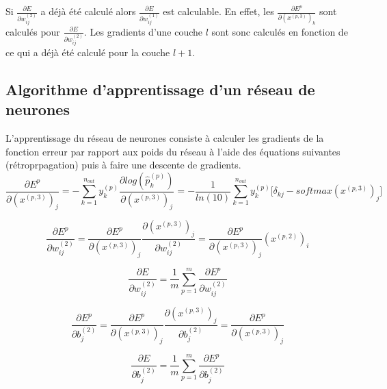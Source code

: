 \documentclass[a4paper,11pt,oneside,roman]{article}
\begin{document}
    Si $\frac{\partial E}{\partial w_{ij}^{(2)}}$ a déjà été calculé alors $\frac{\partial E}{\partial w_{ij}^{(1)}}$ est calculable. En effet, les $\frac{\partial E^p}{\partial (x^{(p,3)})_k}$ sont calculés pour $\frac{\partial E}{\partial w_{ij}^{(2)}}$.
    Les gradients d'une couche $l$ sont sonc calculés en fonction de ce qui a déjà été calculé pour la couche $l+1$.

    \subsection{Algorithme d'apprentissage d'un réseau de neurones}

    L'apprentissage du réseau de neurones consiste à calculer les gradients de la fonction erreur par rapport aux poids du réseau à l'aide des équations suivantes (rétroprpagation) puis à faire une descente de gradients.
    \begin{equation}
        \frac{\partial E^p}{\partial (x^{(p,3)})_{j}} = -\sum\limits_{k=1}^{n_{out}} y_k^{(p)} \frac{\partial log(\hat{p}_{k}^{(p)})}{\partial (x^{(p,3)})_{j}} = - \frac{1}{ln(10)} \sum\limits_{k=1}^{n_{out}} y_k^{(p)} \bigg[ \delta_{kj} - softmax(x^{(p,3)})_j \bigg]
    \end{equation}

    \begin{equation}
        \frac{\partial E^p}{\partial w_{ij}^{(2)}} = \frac{\partial E^p}{\partial (x^{(p,3)})_{j}} \frac{\partial (x^{(p,3)})_{j}}{\partial w_{ij}^{(2)}} = \frac{\partial E^p}{\partial (x^{(p,3)})_{j}} (x^{(p,2)})_i
    \end{equation}

    \begin{equation}
        \frac{\partial E}{\partial w_{ij}^{(2)}} = \frac{1}{m} \sum\limits_{p=1}^{m} \frac{\partial E^p}{\partial w_{ij}^{(2)}}
    \end{equation}

    \begin{equation}
        \frac{\partial E^p}{\partial b_j^{(2)}} = \frac{\partial E^p}{\partial (x^{(p,3)})_{j}} \frac{\partial (x^{(p,3)})_{j}}{\partial b_{j}^{(2)}} = \frac{\partial E^p}{\partial (x^{(p,3)})_{j}}
    \end{equation}

    \begin{equation}
        \frac{\partial E}{\partial b_{j}^{(2)}} = \frac{1}{m} \sum\limits_{p=1}^{m} \frac{\partial E^p}{\partial b_{j}^{(2)}}
    \end{equation}
\end{document}
